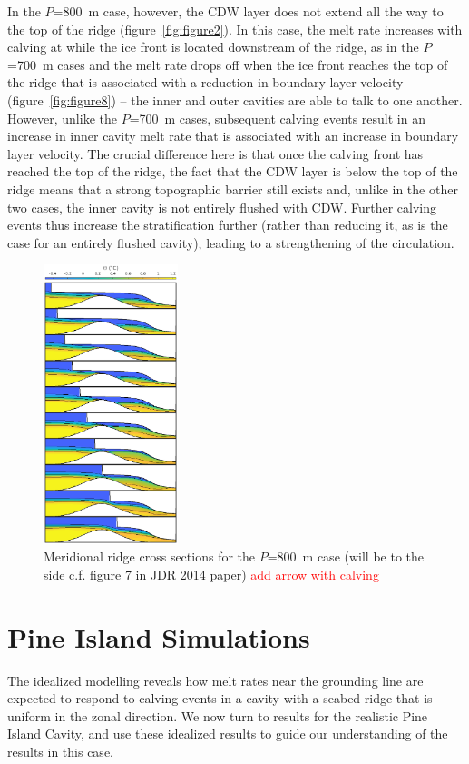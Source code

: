 \documentclass[draft]{agujournal2019}
\newcommand{\red}[1]{\textcolor{red}{#1}}
\begin{document}
In the $P$=800~m case, however, the CDW layer does not extend all the way to the top of the ridge (figure~\ref{fig:figure2}). In this case, the melt rate increases with calving at while the ice front is located downstream of the ridge, as in the $P$=700~m cases and the melt rate drops off when the ice front reaches the top of the ridge that is associated with a reduction in boundary layer velocity (figure~\ref{fig:figure8}) -- the inner and outer cavities are able to talk to one another. However, unlike the $P$=700~m cases, subsequent calving events result in an increase in inner cavity melt rate that is associated with an increase in boundary layer velocity. The crucial difference here is that once the calving front has reached the top of the ridge, the fact that the CDW layer is below the top of the ridge means that a strong topographic barrier still exists and, unlike in the other two cases, the inner cavity is not entirely flushed with CDW. Further calving events thus increase the stratification further (rather than reducing it, as is the case for an entirely flushed cavity), leading to a strengthening of the circulation. 


\begin{figure}
    \centering
    \includegraphics[width = 0.35\textwidth]{../make_figures/plots/figure9.eps}
    \caption{Meridional ridge cross sections for the $P$=800~m case (will be to the side c.f. figure 7 in JDR 2014 paper) \red{add arrow with calving} }
    \label{fig:figure9}
\end{figure}


\section{Pine Island Simulations}
The idealized modelling reveals how melt rates near the grounding line are expected to respond to calving events in a cavity with a seabed ridge that is uniform in the zonal direction. We now turn to results for the realistic Pine Island Cavity, and use these idealized results to guide our understanding of the results in this case. 
\end{document}
